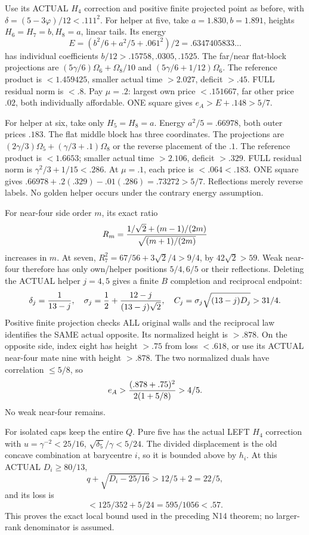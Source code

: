 \documentclass[11pt]{article}
\begin{document}
Use its ACTUAL \(H_4\) correction and positive
finite projected point as before, with
\(\delta=(5-3\varphi)/12<.111^2\).
For helper at five, take
\(a=1.830,b=1.891\), heights
\(H_6=H_7=b,H_8=a\), linear tails.
Its energy
\[
                 E=(b^2/6+a^2/5+.061^2)/2=.6347405833\ldots
\]
has individual coefficients
\(b/12>.15758,.0305,.1525\).
The far/near flat-block projections are
\((5\gamma/6)\Omega_6+\Omega_8/10\) and
\((5\gamma/6+1/12)\Omega_6\).
The reference product is \(<1.459425\),
smaller actual time \(>2.027\), deficit \(>.45\).
FULL residual norm is \(<.8\).
Pay \(\mu=.2\): largest own price
\(<.151667\), far other price \(.02\),
both individually affordable.
ONE square gives \(e_A>E+.148>5/7\).

For helper at six, take only \(H_5=H_8=a\).
Energy \(a^2/5=.66978\), both outer prices \(.183\).
The flat middle block has three coordinates.
The projections are
\((2\gamma/3)\Omega_5+(\gamma/3+.1)\Omega_8\)
or the reverse placement of the \(.1\).
The reference product is \(<1.6653\);
smaller actual time \(>2.106\), deficit \(>.329\).
FULL residual norm is \(\gamma^2/3+1/15<.286\).
At \(\mu=.1\), each price is \(<.064<.183\).
ONE square gives
\(.66978+.2(.329)-.01(.286)=.73272>5/7\).
Reflections merely reverse labels.
No golden helper occurs under the contrary
energy assumption.

For near-four side order \(m\), its exact ratio
\[
 R_m={1/\sqrt2+(m-1)/(2m)\over\sqrt{(m+1)/(2m)}}
\]
increases in \(m\).
At seven,
\(R_7^2=67/56+3\sqrt2/4>9/4\), by \(42\sqrt2>59\).
Weak near-four therefore has only own/helper
positions \(5/4,6/5\) or their reflections.
Deleting the ACTUAL helper \(j=4,5\) gives a
finite \(B\) completion and reciprocal endpoint:
\[
 \delta_j={1\over13-j},\quad
 \sigma_j={1\over2}+{12-j\over(13-j)\sqrt2},\quad
 C_j=\sigma_j\sqrt{(13-j)D_j}>31/4.
\]
Positive finite projection checks ALL original
walls and the reciprocal law identifies the
SAME actual opposite.
Its normalized height is \(>.878\).
On the opposite side, index eight has height
\(>.75\) from loss \(<.618\), or use its ACTUAL
near-four mate nine with height \(>.878\).
The two normalized duals have correlation
\(\le5/8\), so
\[
                       e_A>{(.878+.75)^2\over2(1+5/8)}>4/5.
\]
No weak near-four remains.

For isolated caps keep the entire \(Q\).
Pure five has the actual LEFT \(H_4\)
correction with
\(u=\gamma^{-2}<25/16\),
\(\sqrt{\delta_5}/\gamma<5/24\).
The divided displacement is the old concave
combination at barycentre \(i\), so it is
bounded above by \(h_i\).
At this ACTUAL \(D_i\ge80/13\),
\[
 q+\sqrt{D_i-25/16}>12/5+2=22/5,
\]
and its loss is
\[
                    <125/352+5/24=595/1056<.57 .
\]
This proves the exact local bound used in
the preceding N14 theorem; no larger-rank
denominator is assumed.
\end{document}
